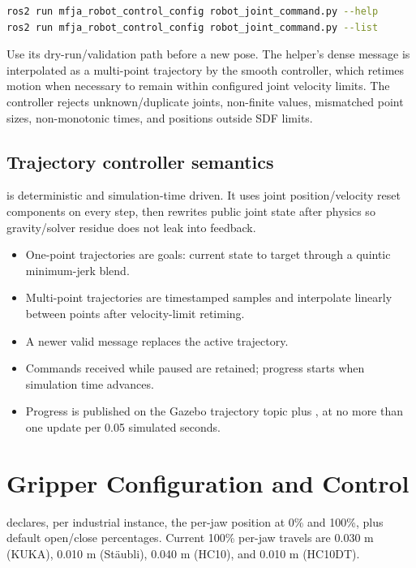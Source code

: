 \begin{lstlisting}[language=bash]
ros2 run mfja_robot_control_config robot_joint_command.py --help
ros2 run mfja_robot_control_config robot_joint_command.py --list
\end{lstlisting}

Use its dry-run/validation path before a new pose. The helper's dense message is
interpolated as a multi-point trajectory by the smooth controller, which retimes
motion when necessary to remain within configured joint velocity limits. The
controller rejects unknown/duplicate joints, non-finite values, mismatched point
sizes, non-monotonic times, and positions outside SDF limits.

\subsection{Trajectory controller semantics}

 is deterministic and simulation-time
driven. It uses joint position/velocity reset components on every step, then
rewrites public joint state after physics so gravity/solver residue does not
leak into feedback.

\begin{itemize}
  \item One-point trajectories are goals: current state to target through a
        quintic minimum-jerk blend.
  \item Multi-point trajectories are timestamped samples and interpolate
        linearly between points after velocity-limit retiming.
  \item A newer valid message replaces the active trajectory.
  \item Commands received while paused are retained; progress starts when
        simulation time advances.
  \item Progress is published on the Gazebo trajectory topic plus
        , at no more than one update per 0.05 simulated seconds.
\end{itemize}

\section{Gripper Configuration and Control}

 declares, per industrial instance, the
per-jaw position at 0\% and 100\%, plus default open/close percentages. Current
100\% per-jaw travels are 0.030 m (KUKA), 0.010 m (St\"aubli), 0.040 m (HC10),
and 0.010 m (HC10DT).

